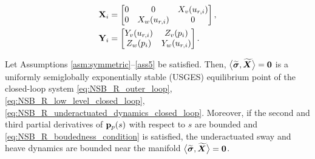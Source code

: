 \begin{align}
    \mathbf{X}_i &= 
    \begin{bmatrix}
        0 & 0 & X_v(u_{r, i}) \\
        0 & X_w(u_{r, i}) & 0
    \end{bmatrix}, \\
    \mathbf{Y}_i &=
    \begin{bmatrix}
        Y_v(u_{r,i}) & Z_v(p_i) \\
        Z_w(p_i) & Y_w(u_{r, i})
    \end{bmatrix}.
\end{align}


\begin{theorem} \label{thm1}
    Let Assumptions \ref{asm:symmetric}--\ref{ass5} be satisfied.
    Then, $\bigl\langle\widetilde{\bm{\sigma}}, \widetilde{\bm{X}}\bigr\rangle = \mathbf{0}$ is a uniformly semiglobally exponentially stable (USGES) equilibrium point of the closed-loop system \eqref{eq:NSB_R_outer_loop}, \eqref{eq:NSB_R_low_level_closed_loop}, \eqref{eq:NSB_R_underactuated_dynamics_closed_loop}.
    Moreover, if the second and third partial derivatives of $\mathbf{p}_p(s)$ with respect to $s$ are bounded and \eqref{eq:NSB_R_boudedness_condition} is satisfied, the underactuated sway and heave dynamics are bounded near the manifold $\bigl\langle\widetilde{\bm{\sigma}}, \widetilde{\bm{X}}\bigr\rangle = \mathbf{0}$.
\end{theorem}

